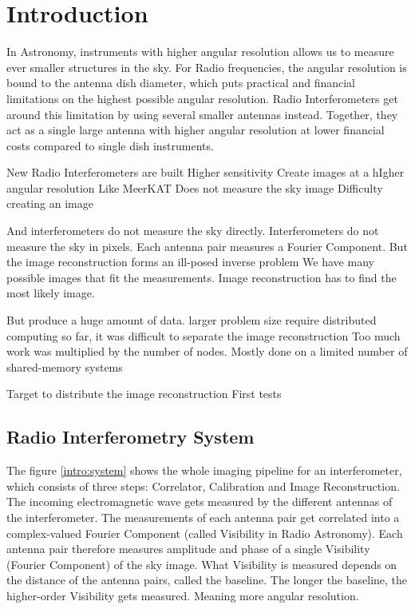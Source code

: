 \section{Introduction}
In Astronomy, instruments with higher angular resolution allows us to measure ever smaller structures in the sky. For Radio frequencies, the angular resolution is bound to the antenna dish diameter, which puts practical and financial limitations on the highest possible angular resolution. Radio Interferometers get around this limitation by using several smaller antennas instead. Together, they act as a single large antenna with higher angular resolution at lower financial costs compared to single dish instruments.

New Radio Interferometers are built
Higher sensitivity
Create images at a hIgher angular resolution
Like MeerKAT
Does not measure the sky image
Difficulty creating an image

And interferometers do not measure the sky directly. Interferometers do not measure the sky in pixels. Each antenna pair measures a Fourier Component. 
But the image reconstruction forms an ill-posed inverse problem
We have many possible images that fit the measurements.
Image reconstruction has to find the most likely image.

But produce a huge amount of data.
larger problem size require distributed computing
so far, it was difficult to separate the image reconstruction
Too much work was multiplied by the number of nodes.
Mostly done on a limited number of shared-memory systems

Target to distribute the image reconstruction
First tests


\subsection{Radio Interferometry System}
The figure \ref{intro:system} shows the whole imaging pipeline for an interferometer, which consists of three steps: Correlator, Calibration and Image Reconstruction. The incoming electromagnetic wave gets measured by the different antennas of the interferometer. The measurements of each antenna pair get correlated into a complex-valued Fourier Component (called Visibility in Radio Astronomy). Each antenna pair therefore measures amplitude and phase of a single Visibility (Fourier Component) of the sky image.
What Visibility is measured depends on the distance of the antenna pairs, called the baseline. The longer the baseline, the higher-order Visibility gets measured. Meaning more angular resolution.

